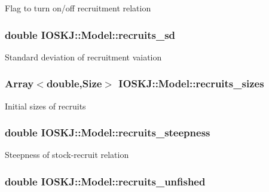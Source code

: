 Flag to turn on/off recruitment relation \hypertarget{classIOSKJ_1_1Model_aff3f79494f94a20043a0c57009129dea}{
\subsubsection[{recruits\-\_\-sd}]{\setlength{\rightskip}{0pt plus 5cm}double I\-O\-S\-K\-J\-::\-Model\-::recruits\-\_\-sd}}\label{classIOSKJ_1_1Model_aff3f79494f94a20043a0c57009129dea}
Standard deviation of recruitment vaiation \hypertarget{classIOSKJ_1_1Model_a55d28db5525f6a4b0702c60dccbebd57}{
\subsubsection[{recruits\-\_\-sizes}]{\setlength{\rightskip}{0pt plus 5cm}Array$<$double,Size$>$ I\-O\-S\-K\-J\-::\-Model\-::recruits\-\_\-sizes}}\label{classIOSKJ_1_1Model_a55d28db5525f6a4b0702c60dccbebd57}
Initial sizes of recruits \hypertarget{classIOSKJ_1_1Model_ae3660f3f79edc131d7b96cf391f6a902}{
\subsubsection[{recruits\-\_\-steepness}]{\setlength{\rightskip}{0pt plus 5cm}double I\-O\-S\-K\-J\-::\-Model\-::recruits\-\_\-steepness}}\label{classIOSKJ_1_1Model_ae3660f3f79edc131d7b96cf391f6a902}
Steepness of stock-\/recruit relation \hypertarget{classIOSKJ_1_1Model_a780f4e69674141e96e028765004608ea}{
\subsubsection[{recruits\-\_\-unfished}]{\setlength{\rightskip}{0pt plus 5cm}double I\-O\-S\-K\-J\-::\-Model\-::recruits\-\_\-unfished}}\label{classIOSKJ_1_1Model_a780f4e69674141e96e028765004608ea}
